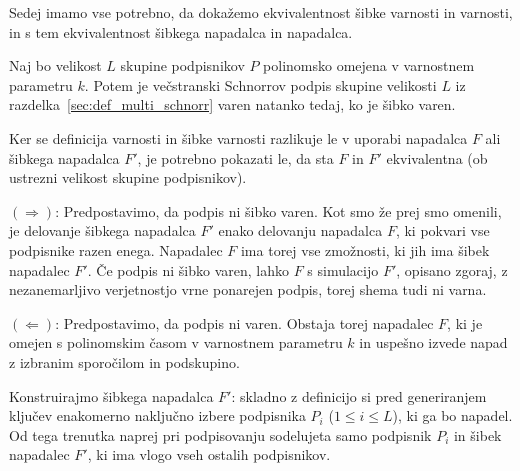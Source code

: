 Sedej imamo vse potrebno, da dokažemo ekvivalentnost šibke varnosti in varnosti, in s tem
ekvivalentnost šibkega napadalca in napadalca.

\begin{izrek}
\label{izr:šibka-varnost}
    Naj bo velikost $L$ skupine podpisnikov $P$ polinomsko omejena v varnostnem parametru $k$.
    Potem je večstranski Schnorrov podpis skupine velikosti $L$ iz razdelka~\ref{sec:def_multi_schnorr}
    varen natanko tedaj, ko je šibko varen.
\end{izrek}

\begin{dokaz}
    Ker se definicija varnosti in šibke varnosti razlikuje le v uporabi napadalca $F$ ali šibkega
    napadalca $F'$, je potrebno pokazati le, da sta $F$ in $F'$ ekvivalentna (ob ustrezni velikost
    skupine podpisnikov).

    $(\Rightarrow)$: Predpostavimo, da podpis ni šibko varen. Kot smo že prej smo omenili, je delovanje
    šibkega napadalca $F'$ enako delovanju napadalca $F$, ki pokvari vse podpisnike razen enega.
    Napadalec $F$ ima torej vse zmožnosti, ki jih ima šibek napadalec $F'$. Če podpis ni šibko varen,
    lahko $F$ s simulacijo $F'$, opisano zgoraj, z nezanemarljivo verjetnostjo vrne ponarejen podpis,
    torej shema tudi ni varna.

    $(\Leftarrow)$: Predpostavimo, da podpis ni varen. Obstaja torej napadalec $F$, ki je omejen
    s polinomskim časom v varnostnem parametru $k$ in uspešno izvede napad z izbranim sporočilom in
    podskupino.

    Konstruirajmo šibkega napadalca $F'$: skladno z definicijo si pred generiranjem ključev enakomerno
    naključno izbere podpisnika $P_i$ ($1 \le i \le L$), ki ga bo napadel. Od tega trenutka naprej
    pri podpisovanju sodelujeta samo podpisnik $P_i$ in šibek napadalec $F'$, ki ima vlogo vseh
    ostalih podpisnikov.


\end{dokaz}
